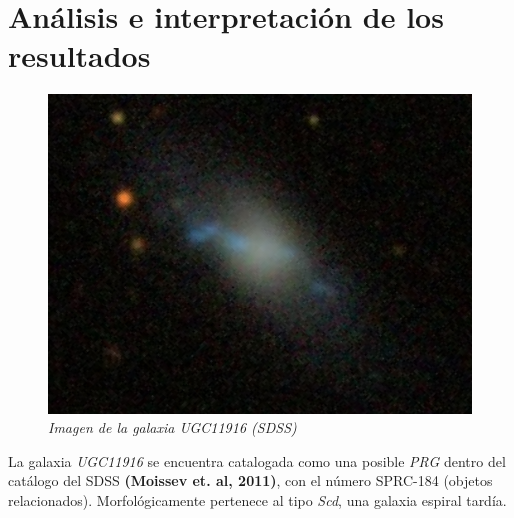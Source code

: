 \documentclass{article}
\begin{document}
\section{Análisis e interpretación de los resultados}
\begin{figure}[H]
	\includegraphics[scale=.20]{imagen2.png}
	\centering	
	\caption{\emph{Imagen de la galaxia UGC11916 (SDSS)}}
	\label{figura 2}
\end{figure}

La galaxia \emph{UGC11916} se encuentra catalogada como una posible \emph{PRG} dentro del catálogo del SDSS \textbf{(Moissev et. al, 2011)}, con el número SPRC-184 (objetos relacionados). Morfológicamente pertenece al tipo \emph{Scd}, una galaxia espiral tardía.
\end{document}

